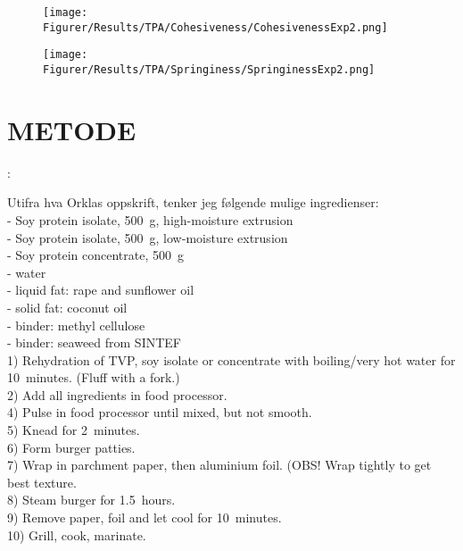 \begin{figure}[H]
    \centering
    \begin{floatrow}
    \captionsetup{justification=raggedright,
    singlelinecheck=false}
    
      {\texttt{[image: Figurer/Results/TPA/Cohesiveness/CohesivenessExp2.png]}}

      {\texttt{[image: Figurer/Results/TPA/Springiness/SpringinessExp2.png]}}
    \end{floatrow}
\end{figure}



\section{METODE}:

Utifra hva Orklas oppskrift, tenker jeg følgende mulige ingredienser:\\
- Soy protein isolate, 500~g, high-moisture extrusion \\
- Soy protein isolate, 500~g, low-moisture extrusion \\
- Soy protein concentrate, 500~g \\
- water \\
- liquid fat: rape and sunflower oil \\
- solid fat: coconut oil \\
- binder: methyl cellulose \\
- binder: seaweed from SINTEF \\

1) Rehydration of TVP, soy isolate or concentrate with boiling/very hot water for 10~minutes. (Fluff with a fork.) \\
2) Add all ingredients in food processor. \\
4) Pulse in food processor until mixed, but not smooth. \\
5) Knead for 2~minutes. \\
6) Form burger patties. \\
7) Wrap in parchment paper, then aluminium foil. (OBS! Wrap tightly to get best texture.  \\
8) Steam burger for 1.5~hours. \\
9) Remove paper, foil and let cool for 10~minutes. \\
10) Grill, cook, marinate. \\

